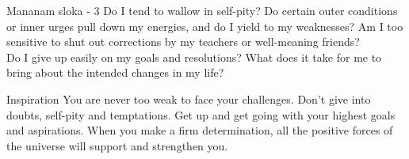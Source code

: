 \newpage
\begin{mananam}{\mananamfont Mananam sloka - 3}
\mananamtext Do I tend to wallow in self-pity? Do certain outer conditions or inner urges pull down my energies, and do I yield to my weaknesses? Am I too sensitive to shut out corrections by my teachers or well-meaning friends?\\
Do I give up easily on my goals and resolutions? What does it take for me to bring about the intended changes in my life?
\end{mananam}
\WritingHand{}
\begin{inspiration}{\mananamfont Inspiration}
\mananamtext You are never too weak to face your challenges. Don’t give into doubts, self-pity and temptations. Get up and get going with your highest goals and aspirations. When you make a firm determination, all the positive forces of the universe will support and strengthen you.
\end{inspiration}
\newpage

